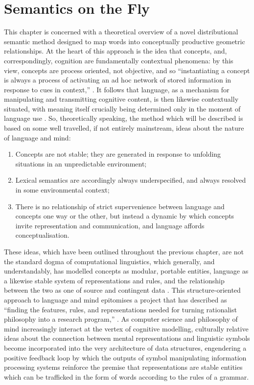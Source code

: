 \chapter{Semantics on the Fly} \label{chap:theory}
This chapter is concerned with a theoretical overview of a novel distributional semantic method designed to map words into conceptually productive geometric relationships.  At the heart of this approach is the idea that concepts, and, correspondingly, cognition are fundamentally contextual phenomena: by this view, concepts are process oriented, not objective, and so ``instantiating a concept is always a process of activating an ad hoc network of stored information in response to cues in context,'' \citep[][p. 546]{Casasanto2015}.  It follows that language, as a mechanism for manipulating and transmitting cognitive content, is then likewise contextually situated, with meaning itself crucially being determined only in the moment of language use \citep{Austin1962}.  So, theoretically speaking, the method which will be described is based on some well travelled, if not entirely mainstream, ideas about the nature of language and mind:

\begin{enumerate}
\item{Concepts are not stable; they are generated in response to unfolding situations in an unpredictable environment;}
\item{Lexical semantics are accordingly always underspecified, and always resolved in some environmental context;}
\item{There is no relationship of strict supervenience between language and concepts one way or the other, but instead a dynamic by which concepts invite representation and communication, and language affords conceptualisation.}
\end{enumerate}

These ideas, which have been outlined throughout the previous chapter, are not the standard dogma of computational linguistics, which generally, and understandably, has modelled concepts as modular, portable entities, language as a likewise stable system of representations and rules, and the relationship between the two as one of source and contingent data \citep[see, for instance, the textbook treatment in][particularly Ch. 17]{JurafskyEA2000}.  This structure-oriented approach to language and mind epitomises a project that \citeauthor{Dreyfus2012} has described as ``finding the features, rules, and representations needed for turning rationalist philosophy into a research program,'' \cite[][p. 89]{Dreyfus2012}.  As computer science and philosophy of mind increasingly interact at the vertex of cognitive modelling, culturally relative ideas about the connection between mental representations and linguistic symbols become incorporated into the very architecture of data structures, engendering a positive feedback loop by which the outputs of symbol manipulating information processing systems reinforce the premise that representations are stable entities which can be trafficked in the form of words according to the rules of a grammar.

